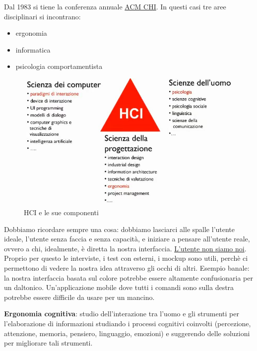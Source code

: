 \documentclass[11pt,a4paper]{book}
\begin{document}
Dal 1983 si tiene la conferenza annuale \href{https://dl.acm.org/conference/chi}{ACM CHI}. In questi casi tre aree disciplinari si incontrano:
\begin{itemize}
	\item ergonomia
	\item informatica
	\item psicologia comportamentista
\end{itemize}
\begin{figure}[h!]
	\begin{center}
		\includegraphics[scale=0.6]{img/001.jpg}
		\caption{HCI e le sue componenti}
		\label{fig: 001}
	\end{center}
\end{figure}
Dobbiamo ricordare sempre una cosa: dobbiamo lasciarci alle spalle l'utente ideale, l'utente senza faccia e senza capacità, e iniziare a pensare all'utente reale, ovvero a chi, idealmente, è diretta la nostra interfaccia. \underline{L'utente non siamo noi}. Proprio per questo le interviste, i test con esterni, i mockup sono utili, perchè ci permettono di vedere la nostra idea attraverso gli occhi di altri. Esempio banale: la nostra interfaccia basata sul colore potrebbe essere altamente confusionaria per un daltonico. Un'applicazione mobile dove tutti i comandi sono sulla destra potrebbe essere difficile da usare per un mancino.

\textbf{Ergonomia cognitiva}: studio dell'interazione tra l'uomo e gli strumenti per l'elaborazione di informazioni studiando i processi cognitivi coinvolti (percezione, attenzione, memoria, pensiero, linguaggio, emozioni) e suggerendo delle soluzioni per migliorare tali strumenti.
\end{document}
